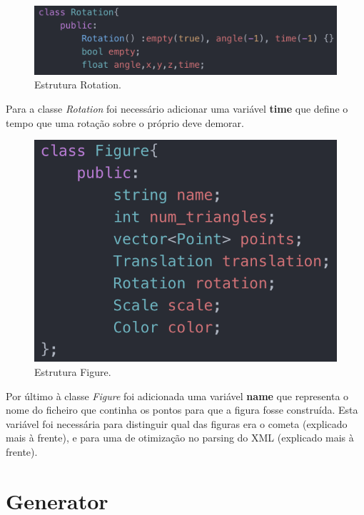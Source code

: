 \documentclass[a4paper]{article}
\begin{document}
\begin{figure}[H]
\centering
\includegraphics[scale=0.75]{rotation.png}
\caption{Estrutura Rotation.}
\label{img:rotation}
\end{figure}

Para a classe \textit{Rotation} foi necessário adicionar uma variável \textbf{time} que define o tempo que uma rotação sobre o próprio deve demorar.

\begin{figure}[H]
\centering
\includegraphics[scale=0.75]{figure.png}
\caption{Estrutura Figure.}
\label{img:figure}
\end{figure}

Por último à classe \textit{Figure} foi adicionada uma variável \textbf{name} que representa o nome do ficheiro que continha os pontos para que a figura fosse construída. Esta variável foi necessária para distinguir qual das figuras era o cometa (explicado mais à frente), e para uma de otimização no parsing do XML (explicado mais à frente).



\section{Generator}
\label{sec:generator}
\end{document}

